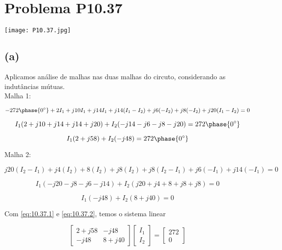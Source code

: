 
\section*{Problema P10.37}

\renewcommand*\thesection{10.37}

\begin{center}
    \texttt{[image: P10.37.jpg]}
\end{center}

\subsection*{(a)}

Aplicamos análise de malhas nas duas malhas do circuto, considerando as indutâncias mútuas. \\
Malha 1:

\[ - 272\phase{0^{\circ}} + 2I_1 + j10I_1 + j14I_1 + j14(I_1 - I_2) + j6(-I_2) + j8(-I_2) + j20(I_1 - I_2) = 0  \]

\[ I_1(2 + j10 + j14 + j14 + j20) + I_2(-j14 -j6 - j8 - j20) = 272\phase{0^{\circ}}  \]

\begin{equation}\label{eq:10.37.1}
    I_1(2 + j58) + I_2(-j48) = 272\phase{0^{\circ}}
\end{equation}

Malha 2:

\[ j20(I_2 - I_1) + j4(I_2) + 8(I_2) + j8(I_2) + j8(I_2 - I_1) + j6(-I_1) + j14(-I_1)  = 0 \]

\[ I_1(-j20 - j8 - j6 - j14) + I_2(j20 + j4 + 8 + j8 + j8)  = 0 \]

\begin{equation}\label{eq:10.37.2}
    I_1(-j48) + I_2(8 + j40) = 0
\end{equation}

Com \eqref{eq:10.37.1} e \eqref{eq:10.37.2}, temos o sistema linear

\begingroup
\renewcommand*{\arraystretch}{3}

\[
    \begin{bmatrix}
        2 + j58 & -j48    \\
        -j48    & 8 + j40
    \end{bmatrix}
    \begin{bmatrix}
        I_1 \\
        I_2
    \end{bmatrix}
    =
    \begin{bmatrix}
        272 \\
        0
    \end{bmatrix}
\]

